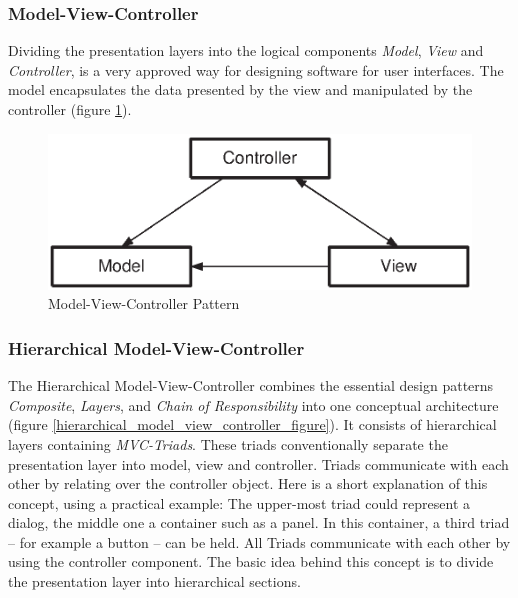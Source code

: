 \subsubsection{Model-View-Controller}
\label{model_view_controller_heading}

Dividing the presentation layers into the logical components \emph{Model},
\emph{View} and \emph{Controller}, is a very approved way for designing software
for user interfaces. The model encapsulates the data presented by the view and
manipulated by the controller (figure \ref{model_view_controller_figure}).

\begin{figure}[ht]
    \begin{center}
       \includegraphics[scale=0.6]{eps/mvc-1.eps}
       \caption{Model-View-Controller Pattern}
       \label{model_view_controller_figure}
    \end{center}
\end{figure}

\subsubsection{Hierarchical Model-View-Controller}
\label{hierarchical_model_view_controller_heading}

The Hierarchical Model-View-Controller \cite{cai} combines the essential design
patterns \emph{Composite}, \emph{Layers}, and \emph{Chain of Responsibility}
into one conceptual architecture (figure \ref{hierarchical_model_view_controller_figure}).
It consists of hierarchical layers containing \emph{MVC-Triads}. These triads
conventionally separate the presentation layer into model, view and controller.
Triads communicate with each other by relating over the controller object.
Here is a short explanation of this concept, using a practical example:
The upper-most triad could represent a dialog, the middle one a container such as
a panel. In this container, a third triad -- for example a button -- can be held.
All Triads communicate with each other by using the controller component. The
basic idea behind this concept is to divide the presentation layer into hierarchical
sections.

